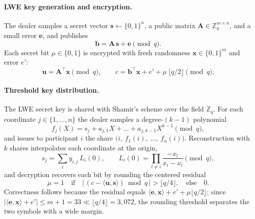 \documentclass[preprint,12pt,number]{elsarticle}
\begin{document}
\paragraph{LWE key generation and encryption.}
The dealer samples a secret vector $\mathbf{s} \gets \{0,1\}^n$, a public
matrix $\mathbf{A} \in \mathbb{Z}_q^{m \times n}$, and a small error
$\mathbf{e}$, and publishes
\begin{equation}
  \mathbf{b} = \mathbf{A}\,\mathbf{s} + \mathbf{e} \pmod{q}.
  \label{eq:key}
\end{equation}
Each secret bit $\mu \in \{0,1\}$ is encrypted with fresh randomness
$\mathbf{x} \in \{0,1\}^m$ and error $e'$:
\begin{equation}
  \mathbf{u} = \mathbf{A}^{\!\top}\mathbf{x} \pmod{q},
  \qquad
  c = \mathbf{b}^{\!\top}\mathbf{x} + e' + \mu\,\lfloor q/2 \rfloor \pmod{q}.
  \label{eq:enc}
\end{equation}

\paragraph{Threshold key distribution.}
The LWE secret key is shared with Shamir's scheme over the field
$\mathbb{Z}_q$. For each coordinate $j \in \{1,\dots,n\}$ the dealer samples a
degree-$(k-1)$ polynomial
\begin{equation}
  f_j(X) = s_j + a_{j,1}X + \dots + a_{j,k-1}X^{k-1} \pmod{q},
  \label{eq:poly}
\end{equation}
and issues to participant $i$ the share
$\bigl(i,\ f_1(i),\ \dots,\ f_n(i)\bigr)$. Reconstruction with $k$ shares
interpolates each coordinate at the origin,
\begin{equation}
  s_j = \sum_i y_{i,j}\,L_i(0),
  \qquad
  L_i(0) = \prod_{l \neq i} \frac{-x_l}{x_i - x_l} \pmod{q},
  \label{eq:lagrange}
\end{equation}
and decryption recovers each bit by rounding the centered residual
\begin{equation}
  \mu = 1 \quad\text{if}\quad
  \bigl|\,(c - \langle \mathbf{u}, \mathbf{s}\rangle) \bmod q\,\bigr|
  > \lfloor q/4 \rfloor, \quad\text{else}\quad 0.
  \label{eq:dec}
\end{equation}
Correctness follows because the residual equals
$\langle \mathbf{e}, \mathbf{x}\rangle + e' + \mu\lfloor q/2\rfloor$; since
$|\langle \mathbf{e}, \mathbf{x}\rangle + e'| \le m + 1 = 33 \ll \lfloor q/4
\rfloor = 3{,}072$, the rounding threshold separates the two symbols with a
wide margin.
\end{document}
